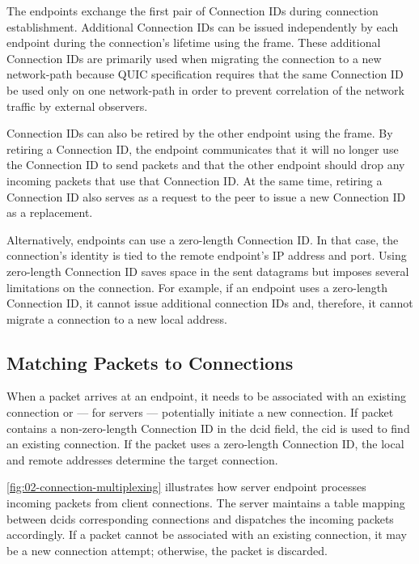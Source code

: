 The endpoints exchange the first pair of Connection IDs during connection establishment. Additional
Connection IDs can be issued independently by each endpoint during the connection's lifetime using
the \NEWCONNECTIONID{} frame. These additional Connection IDs are primarily used when migrating the
connection to a new \gls{network-path} because QUIC specification requires that the same Connection
ID be used only on one \gls{network-path} in order to prevent correlation of the network traffic by
external observers.

Connection IDs can also be retired by the other endpoint using the \RETIRECONNECTIONID{} frame. By
retiring a Connection ID, the endpoint communicates that it will no longer use the Connection ID to
send packets and that the other endpoint should drop any incoming packets that use that Connection
ID. At the same time, retiring a Connection ID also serves as a request to the peer to issue a new
Connection ID as a replacement.

Alternatively, endpoints can use a zero-length Connection ID. In that case, the connection's
identity is tied to the remote endpoint's IP address and port. Using zero-length Connection ID saves
space in the sent datagrams but imposes several limitations on the connection. For example, if an
endpoint uses a zero-length Connection ID, it cannot issue additional connection IDs and, therefore,
it cannot migrate a connection to a new local address.

\subsection{Matching Packets to Connections}

When a packet arrives at an endpoint, it needs to be associated with an existing connection or ---
for servers --- potentially initiate a new connection. If packet contains a non-zero-length
Connection ID in the \gls{dcid} field, the \gls{cid} is used to find an existing connection. If the
packet uses a zero-length Connection ID, the local and remote addresses determine the target
connection.

\autoref{fig:02-connection-multiplexing} illustrates how server endpoint processes incoming packets
from client connections. The server maintains a table mapping between \gls{dcid}s corresponding
connections and dispatches the incoming packets accordingly. If a packet cannot be associated with
an existing connection, it may be a new connection attempt; otherwise, the packet is discarded.

